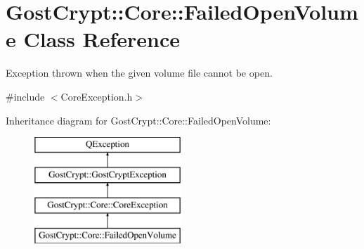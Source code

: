 \hypertarget{class_gost_crypt_1_1_core_1_1_failed_open_volume}{}\section{Gost\+Crypt\+:\+:Core\+:\+:Failed\+Open\+Volume Class Reference}
\label{class_gost_crypt_1_1_core_1_1_failed_open_volume}


Exception thrown when the given volume file cannot be open.  




{\ttfamily \#include $<$Core\+Exception.\+h$>$}

Inheritance diagram for Gost\+Crypt\+:\+:Core\+:\+:Failed\+Open\+Volume\+:\begin{figure}[H]
\begin{center}
\leavevmode
\includegraphics[height=4.000000cm]{class_gost_crypt_1_1_core_1_1_failed_open_volume}
\end{center}
\end{figure}

